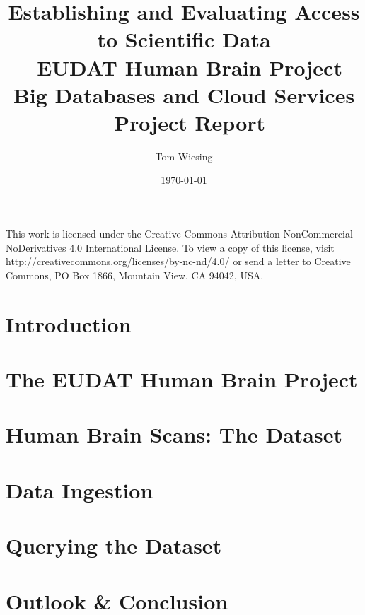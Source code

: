 \documentclass[12pt]{article}
\title{Establishing and Evaluating Access to Scientific Data \\ EUDAT Human Brain Project \\ Big Databases and Cloud Services \\ Project Report}
\author{Tom Wiesing}
\date{\today}
\begin{document}
	
	\maketitle
	

	\newpage
	
	\tableofcontents
	
	
	\vspace{\fill}\noindent	
	This work is licensed under the Creative Commons Attribution-NonCommercial-NoDerivatives 4.0 International License. To view a copy of this license, visit \url{http://creativecommons.org/licenses/by-nc-nd/4.0/} or send a letter to Creative Commons, PO Box 1866, Mountain View, CA 94042, USA. 
	\newpage
	
	\section{Introduction}
	
		
	\section{The EUDAT Human Brain Project}
	
	
	\section{Human Brain Scans: The Dataset}
	
	
	\section{Data Ingestion}
	
	
	\section{Querying the Dataset}
	
		
	\section{Outlook \& Conclusion}
	
	
\end{document}
